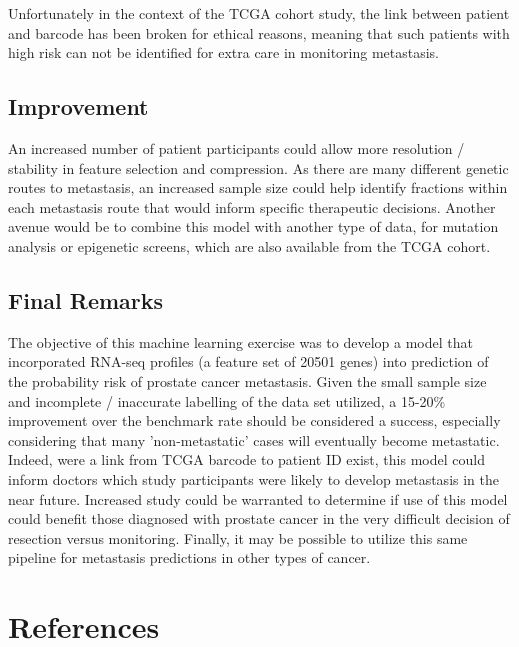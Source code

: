 \documentclass[final]{article}
\begin{document}
Unfortunately in the context of the TCGA cohort study, the link between patient
and barcode has been broken for ethical reasons, meaning that such patients with
high risk  can not be identified for extra care in monitoring metastasis.

\subsection{Improvement}

An increased number of patient participants could allow more resolution / stability in
feature selection and  compression.  As there are many different genetic routes to metastasis,
an increased sample size could help identify fractions within each metastasis route
that would inform specific therapeutic decisions.  Another avenue would be to
combine this model with another type of data, for mutation analysis or epigenetic
screens, which are also available from the TCGA cohort.

\subsection{Final Remarks}

The objective of this machine learning exercise was to develop a model that
incorporated RNA-seq profiles (a feature set of 20501 genes) into prediction of
the probability risk of prostate cancer  metastasis.  Given the small sample
size and incomplete / inaccurate labelling of  the data set utilized, a 15-20\%
improvement over the benchmark rate should be  considered a success, especially
considering that many 'non-metastatic' cases will eventually become metastatic.
Indeed, were a link from TCGA barcode to patient ID exist, this model could
inform doctors which study participants were likely to  develop metastasis in
the near future.  Increased study could be warranted to  determine if use of
this model could benefit those diagnosed with prostate cancer in the very difficult
decision of resection versus monitoring.  Finally, it may be possible to utilize
this same pipeline for metastasis predictions in other types of cancer.

\section{References}
\end{document}
